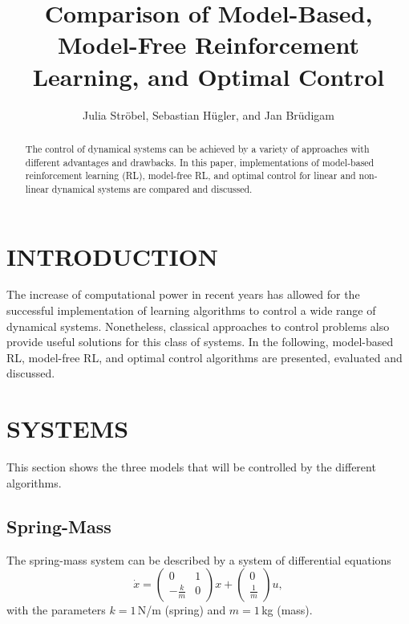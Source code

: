 \documentclass[letterpaper, 10 pt, conference]{ieeeconf}  %
\title{\LARGE \bf
Comparison of Model-Based, Model-Free Reinforcement Learning, and Optimal Control
}
\author{Julia Str\"obel, Sebastian H\"ugler, and Jan Br\"udigam}
\begin{document}
\maketitle
\thispagestyle{empty}
\pagestyle{empty}
\setlength{\belowcaptionskip}{-5pt}

\begin{abstract}

The control of dynamical systems can be achieved by a variety of approaches with different advantages and drawbacks. In this paper, implementations of model-based reinforcement learning (RL), model-free RL, and optimal control for linear and non-linear dynamical systems are compared and discussed.

\end{abstract}


\section{INTRODUCTION}

The increase of computational power in recent years has allowed for the successful implementation of learning algorithms to control a wide range of dynamical systems. Nonetheless, classical approaches to control problems also provide useful solutions for this class of systems. In the following, model-based RL, model-free RL, and optimal control algorithms are presented, evaluated and discussed.
\section{SYSTEMS}
This section shows the three models that will be controlled by the different algorithms.
\subsection{Spring-Mass}
The spring-mass system can be described by a system of differential equations
\begin{equation}\label{eqn:JanSMsys}
	\dot{x}=	
		\left( {\begin{array}{cc}
			0 &1\\
			-\frac{k}{m} &0\end{array} } \right)x + 
		\left( {\begin{array}{cc}
		0\\
		\frac{1}{m}\end{array} } \right)u,
\end{equation}
with the parameters $k=1$\,N/m (spring) and $m=1$\,kg (mass).
\end{document}
